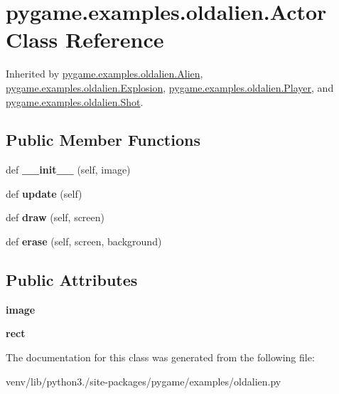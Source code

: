\hypertarget{classpygame_1_1examples_1_1oldalien_1_1_actor}{}\section{pygame.\+examples.\+oldalien.\+Actor Class Reference}
\label{classpygame_1_1examples_1_1oldalien_1_1_actor}


Inherited by \hyperlink{classpygame_1_1examples_1_1oldalien_1_1_alien}{pygame.\+examples.\+oldalien.\+Alien}, \hyperlink{classpygame_1_1examples_1_1oldalien_1_1_explosion}{pygame.\+examples.\+oldalien.\+Explosion}, \hyperlink{classpygame_1_1examples_1_1oldalien_1_1_player}{pygame.\+examples.\+oldalien.\+Player}, and \hyperlink{classpygame_1_1examples_1_1oldalien_1_1_shot}{pygame.\+examples.\+oldalien.\+Shot}.

\subsection*{Public Member Functions}
\begin{DoxyCompactItemize}
\item 
\mbox{\label{classpygame_1_1examples_1_1oldalien_1_1_actor_a027622db712f095c216e7b46ff027a11}} 
def {\bfseries \+\_\+\+\_\+init\+\_\+\+\_\+} (self, image)
\item 
\mbox{\label{classpygame_1_1examples_1_1oldalien_1_1_actor_a1b7ff7c9b912b2fab7df078151554ccb}} 
def {\bfseries update} (self)
\item 
\mbox{\label{classpygame_1_1examples_1_1oldalien_1_1_actor_a7b10194fe247db7b9775c6551dcd9dd5}} 
def {\bfseries draw} (self, screen)
\item 
\mbox{\label{classpygame_1_1examples_1_1oldalien_1_1_actor_a4a1e1504e5fc34bd5b961d8ffaf5e1a3}} 
def {\bfseries erase} (self, screen, background)
\end{DoxyCompactItemize}
\subsection*{Public Attributes}
\begin{DoxyCompactItemize}
\item 
\mbox{\label{classpygame_1_1examples_1_1oldalien_1_1_actor_aaa25189d87e13c8825de6dcc03e099a5}} 
{\bfseries image}
\item 
\mbox{\label{classpygame_1_1examples_1_1oldalien_1_1_actor_adc5b4f15e9b3e0ca4ce3c0fa30e7bf94}} 
{\bfseries rect}
\end{DoxyCompactItemize}


The documentation for this class was generated from the following file\+:\begin{DoxyCompactItemize}
\item 
venv/lib/python3./site-\/packages/pygame/examples/oldalien.\+py\end{DoxyCompactItemize}
